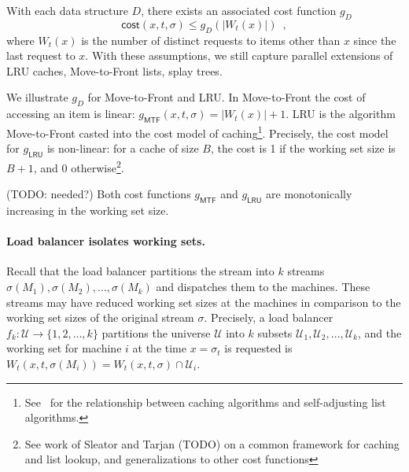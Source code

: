 With each data structure $D$, there exists an associated cost function $g_D$ 
\[
	\textsf{cost}(x, t, \sigma) \le g_D(|W_t(x)|) \enspace ,
\]
where $W_t(x)$ is the number of distinct requests to items other than $x$ since the last request to $x$.
With these assumptions, we still capture parallel extensions of LRU caches, Move-to-Front lists, splay trees. 

We illustrate $g_D$ for Move-to-Front and LRU. In Move-to-Front the cost of accessing an item is linear: $g_\textsf{MTF}(x,t,\sigma) = |W_t(x)| + 1$.  LRU is the algorithm Move-to-Front casted into the cost model of caching\footnote{See~\cite{SleatorT85} for the relationship between caching algorithms and self-adjusting list algorithms.}. Precisely, the cost model for $g_\textsf{LRU}$ is non-linear: for a cache of size $B$, the cost is 1 if the working set size is $B+1$, and 0 otherwise\footnote{See work of Sleator and Tarjan (TODO) on a common framework for caching and list lookup, and generalizations to other cost functions}.

(TODO: needed?)
Both cost functions $g_\textsf{MTF}$ and $g_\textsf{LRU}$ are monotonically increasing in the working set size.




\paragraph*{Load balancer isolates working sets.}
Recall that the load balancer partitions the stream into $k$ streams $\sigma(M_1), \sigma(M_2), \ldots, \sigma(M_k)$ and dispatches them to the machines.
These streams may have reduced working set sizes at the machines in comparison to the working set sizes of the original stream $\sigma$.
Precisely, a load balancer $f_k : \mathcal{U} \to \{1, 2, \ldots, k\}$ partitions the universe $\mathcal{U}$ into $k$ subsets $\mathcal{U}_1, \mathcal{U}_2, \ldots, \mathcal{U}_k$, and the working set for machine $i$ at the time $x = \sigma_t$ is requested is $W_t(x, t, \sigma(M_i)) = W_t(x, t, \sigma) \cap \mathcal{U}_i$.




